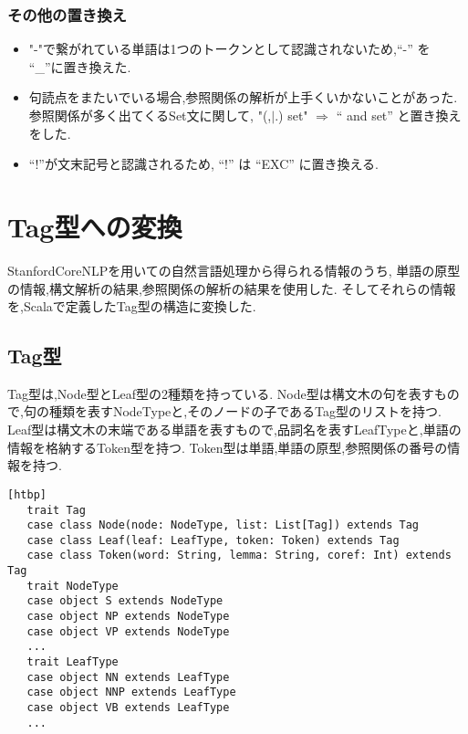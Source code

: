 \documentclass[uplatex,a4j]{jsreport}
\begin{document}
\subsubsection*{その他の置き換え}
\begin{itemize}
   \item "-"で繋がれている単語は1つのトークンとして認識されないため,“-” を “_”に置き換えた.
   \item 句読点をまたいでいる場合,参照関係の解析が上手くいかないことがあった.参照関係が多く出てくるSet文に関して, 
   "(,$|$.) set" $\Rightarrow$ “ and set” と置き換えをした.
   \item “!”が文末記号と認識されるため, “!” は “EXC” に置き換える.
 \end{itemize}

\section{Tag型への変換}
StanfordCoreNLPを用いての自然言語処理から得られる情報のうち,
単語の原型の情報,構文解析の結果,参照関係の解析の結果を使用した.
そしてそれらの情報を,Scalaで定義したTag型の構造に変換した.\\
\subsection{Tag型}
Tag型は,Node型とLeaf型の2種類を持っている.
Node型は構文木の句を表すもので,句の種類を表すNodeTypeと,そのノードの子であるTag型のリストを持つ.
Leaf型は構文木の末端である単語を表すもので,品詞名を表すLeafTypeと,単語の情報を格納するToken型を持つ.
Token型は単語,単語の原型,参照関係の番号の情報を持つ.\\
\begin{lstlisting}[basicstyle=\ttfamily\footnotesize, frame=single, caption=Tagの定義,label=Tag][htbp]
   trait Tag
   case class Node(node: NodeType, list: List[Tag]) extends Tag
   case class Leaf(leaf: LeafType, token: Token) extends Tag
   case class Token(word: String, lemma: String, coref: Int) extends Tag
   trait NodeType
   case object S extends NodeType
   case object NP extends NodeType
   case object VP extends NodeType
   ...
   trait LeafType
   case object NN extends LeafType
   case object NNP extends LeafType
   case object VB extends LeafType
   ...
\end{lstlisting}
\end{document}
